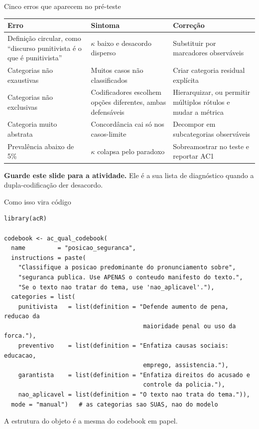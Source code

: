\documentclass[11pt,aspectratio=169]{beamer}
\begin{document}
\begin{frame}{Cinco erros que aparecem no pré-teste}
\begin{table}
\scriptsize
\begin{tabular}{p{3.8cm}p{4.0cm}p{4.8cm}}
\toprule
\textbf{Erro} & \textbf{Sintoma} & \textbf{Correção} \\
\midrule
Definição circular, como ``discurso punitivista é o que é punitivista'' &
$\kappa$ baixo e desacordo disperso & Substituir por marcadores observáveis \\
\addlinespace
Categorias não exaustivas & Muitos casos não classificados &
Criar categoria residual explícita \\
\addlinespace
Categorias não exclusivas & Codificadores escolhem opções diferentes, ambas
defensáveis & Hierarquizar, ou permitir múltiplos rótulos e mudar a métrica \\
\addlinespace
Categoria muito abstrata & Concordância cai só nos casos-limite &
Decompor em subcategorias observáveis \\
\addlinespace
Prevalência abaixo de 5\% & $\kappa$ colapsa pelo paradoxo &
Sobreamostrar no teste e reportar AC1 \\
\bottomrule
\end{tabular}
\end{table}
\vspace{0.1cm}
\footnotesize \textbf{Guarde este slide para a atividade.} Ele é a sua lista de
diagnóstico quando a dupla-codificação der desacordo.
\end{frame}

\begin{frame}[fragile]{Como isso vira código}
\begin{lstlisting}
library(acR)

codebook <- ac_qual_codebook(
  name         = "posicao_seguranca",
  instructions = paste(
    "Classifique a posicao predominante do pronunciamento sobre",
    "seguranca publica. Use APENAS o conteudo manifesto do texto.",
    "Se o texto nao tratar do tema, use 'nao_aplicavel'."),
  categories = list(
    punitivista   = list(definition = "Defende aumento de pena, reducao da
                                       maioridade penal ou uso da forca."),
    preventivo    = list(definition = "Enfatiza causas sociais: educacao,
                                       emprego, assistencia."),
    garantista    = list(definition = "Enfatiza direitos do acusado e
                                       controle da policia."),
    nao_aplicavel = list(definition = "O texto nao trata do tema.")),
  mode = "manual")   # as categorias sao SUAS, nao do modelo
\end{lstlisting}
\footnotesize A estrutura do objeto é a mesma do codebook em papel.
\end{frame}
\end{document}
